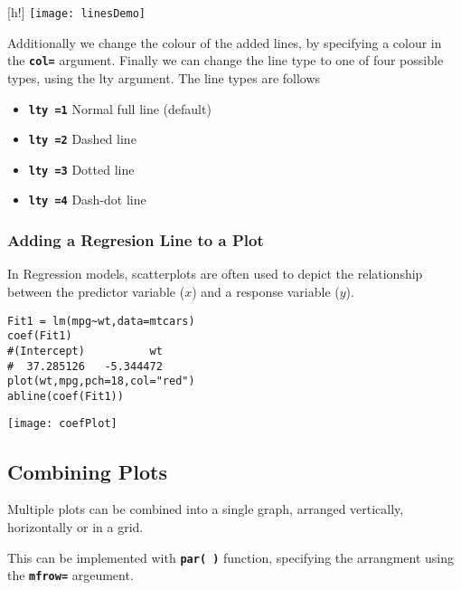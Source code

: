 \begin{center}[h!]
\texttt{[image: linesDemo]}
\end{center}

Additionally we change the colour of the added lines, by specifying a colour in the \texttt{\textbf{col=}} argument. Finally we can change the line type to one of four possible types, using the lty argument.
The line types are follows 
\begin{itemize}
\item \texttt{\textbf{lty =1}}   Normal full line (default)
\item \texttt{\textbf{lty =2}}  Dashed line 
\item \texttt{\textbf{lty =3}}   Dotted line
\item \texttt{\textbf{lty =4}}   Dash-dot line
\end{itemize}


\subsubsection{Adding a Regresion Line to a Plot}
In Regression models, scatterplots are often used to depict the relationship between the predictor variable ($x$) and a response variable ($y$).


\begin{framed}
\begin{verbatim}
Fit1 = lm(mpg~wt,data=mtcars)
coef(Fit1)
#(Intercept)          wt 
#  37.285126   -5.344472 
plot(wt,mpg,pch=18,col="red")
abline(coef(Fit1))
\end{verbatim}
\end{framed}
\begin{center}
\texttt{[image: coefPlot]}
\end{center}


\subsection{Combining Plots}
Multiple plots can be combined into a single graph, arranged vertically, horizontally or in a grid.

This can be implemented with \texttt{\textbf{par( )}} function, specifying the arrangment using the \texttt{\textbf{mfrow=}} argeument.

